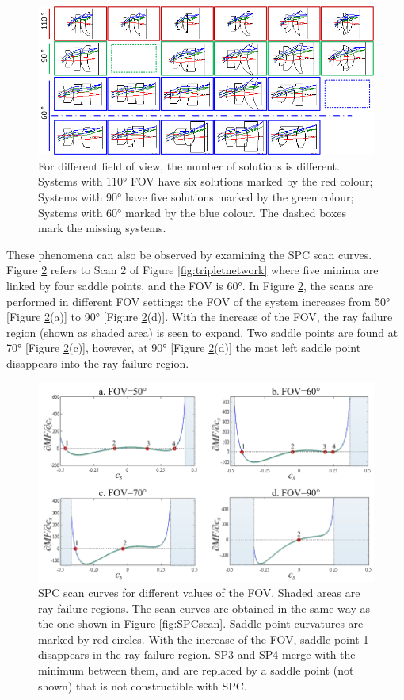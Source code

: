 \begin{figure}[h!]
    \centering
    \includegraphics[width=1.0\textwidth]{chapter-3/figures/FOVvarying.png}
    \caption{For different field of view, the number of solutions is different. Systems with 110° FOV have six solutions marked by the red colour; Systems with 90° have five solutions marked by the green colour; Systems with 60° marked by the blue colour. The dashed boxes mark the missing systems.}
    \label{fig:FOVvarying}
\end{figure}

These phenomena can also be observed by examining the SPC scan curves. Figure \ref{fig:phasechange_field} refers to Scan 2 of Figure \ref{fig:tripletnetwork} where five minima are linked by four saddle points, and the FOV is 60°. In Figure \ref{fig:phasechange_field}, the scans are performed in different FOV settings: the FOV of the system increases from 50° [Figure \ref{fig:phasechange_field}(a)] to 90° [Figure \ref{fig:phasechange_field}(d)]. With the increase of the FOV, the ray failure region (shown as shaded area) is seen to expand. Two saddle points are found at 70° [Figure \ref{fig:phasechange_field}(c)], however, at 90° [Figure \ref{fig:phasechange_field}(d)] the most left saddle point disappears into the ray failure region.
\begin{figure}[h!]
    \centering
    \includegraphics[width=.85\textwidth]{chapter-3/figures/PhaseTransition_field.png}
    \caption{SPC scan curves for different values of the FOV. Shaded areas are ray failure regions. The scan curves are obtained in the same way as the one shown in Figure \ref{fig:SPCscan}. Saddle point curvatures are marked by red circles. With the increase of the FOV, saddle point 1 disappears in the ray failure region. SP3 and SP4 merge with the minimum between them, and are replaced by a saddle point (not shown) that is not constructible with SPC.}
    \label{fig:phasechange_field}
\end{figure}

